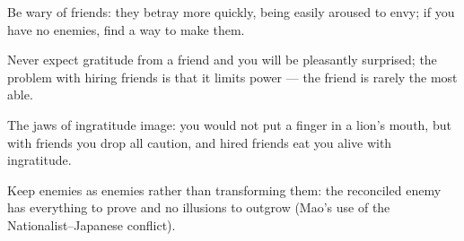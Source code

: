 

\begin{distilled}
  \item Be wary of friends: they betray more quickly, being easily aroused to envy; if you have no enemies, find a way to make them.
  \item Never expect gratitude from a friend and you will be pleasantly surprised; the problem with hiring friends is that it limits power --- the friend is rarely the most able.
  \item The jaws of ingratitude image: you would not put a finger in a lion's mouth, but with friends you drop all caution, and hired friends eat you alive with ingratitude.
  \item Keep enemies as enemies rather than transforming them: the reconciled enemy has everything to prove and no illusions to outgrow (Mao's use of the Nationalist--Japanese conflict).
\end{distilled}
